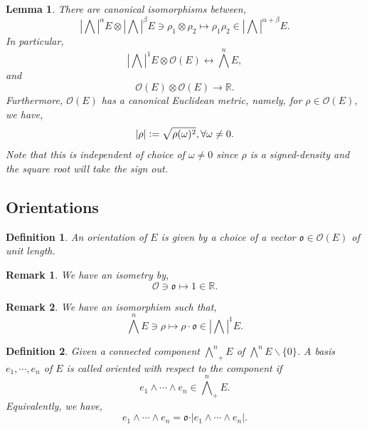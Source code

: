 \documentclass[8pt]{article}
\newtheorem{definition}{Definition}[section]
\newtheorem{lemma}{Lemma}[section]
\newtheorem{remark}{Remark}[section]
\newcommand{\defeq}{\vcentcolon=}
\newcommand{\R}[0]{\mathbb{R}}
\begin{document}
\begin{lemma}
  \label{lemma_11_3}
  There are canonical isomorphisms between,
  \begin{equation*}
  \left\vert\bigwedge\right\vert^\alpha E\otimes\left\vert\bigwedge\right\vert^\beta E\ni \rho_1\otimes\rho_2\mapsto\rho_1\rho_2 \in\left\vert\bigwedge\right\vert^{\alpha+\beta}E.
  \end{equation*}
  In particular,
  \begin{equation*}
    \left\vert\bigwedge\right\vert^1 E\otimes\mathcal{O}(E)\longleftrightarrow \bigwedge^nE,
  \end{equation*}
  and 
  \begin{equation*}
    \mathcal{O}(E)\otimes\mathcal{O}(E)\to\R.
  \end{equation*}
  Furthermore, $\mathcal{O}(E)$ has a canonical Euclidean metric, namely, for $\rho\in\mathcal{O}(E)$, we have,
  \begin{equation*}
    \vert\rho\vert\defeq \sqrt{\rho(\omega)^2},\forall \omega\not=0.
  \end{equation*}
  Note that this is independent of choice of $\omega\not=0$ since $\rho$ is a signed-density and the square root will take the sign out.
\end{lemma}

\subsection{Orientations}

\begin{definition}
  An orientation of $E$ is given by a choice of a vector $\mathfrak{o}\in\mathcal{O}(E)$ of unit length.
\end{definition}

\begin{remark}
  We have an isometry by,
  \begin{equation*}
    \mathcal{O}\ni\mathfrak{o}\mapsto 1\in\R.
  \end{equation*}
\end{remark}

\begin{remark}
  We have an isomorphism such that,
  \begin{equation*}
    \bigwedge^n E\ni\rho\mapsto \rho\cdot\mathfrak{o}\in\left\vert\bigwedge\right\vert^1E.
  \end{equation*}
\end{remark}

\begin{definition}
  Given a connected component ${\bigwedge^n}_+ E$ of $\bigwedge^n E\backslash\{0\}$. 
  A basis $e_1,\cdots,e_n$ of $E$ is called oriented with respect to the component if 
  \begin{equation*}
    e_1\wedge\cdots\wedge e_n\in{\bigwedge^n}_+E.
  \end{equation*}
  Equivalently, we have,
  \begin{equation*}
    e_1\wedge\cdots\wedge e_n = \mathfrak{o}\cdot\vert e_1\wedge\cdots\wedge e_n\vert.
  \end{equation*}
\end{definition}
\end{document}
